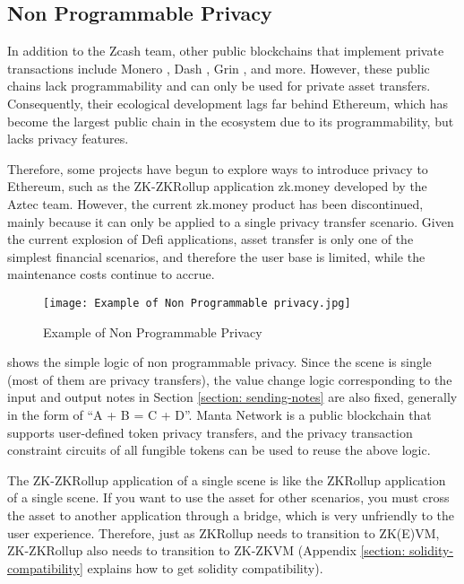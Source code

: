\subsection{Non Programmable Privacy}

In addition to the Zcash team, other public blockchains that implement private transactions include Monero \cite{website:Monero}, Dash \cite{website:Dash}, Grin \cite{website:Grin}, and more. However, these public chains lack programmability and can only be used for private asset transfers. Consequently, their ecological development lags far behind Ethereum, which has become the largest public chain in the ecosystem due to its programmability, but lacks privacy features.

Therefore, some projects have begun to explore ways to introduce privacy to Ethereum, such as the ZK-ZKRollup application zk.money \cite{website:zk.money} developed by the Aztec \cite{website:Aztec} team. However, the current zk.money product has been discontinued, mainly because it can only be applied to a single privacy transfer scenario. Given the current explosion of Defi applications, asset transfer is only one of the simplest financial scenarios, and therefore the user base is limited, while the maintenance costs continue to accrue.
\begin{figure}[!ht]
    \centering
    \texttt{[image: Example of Non Programmable privacy.jpg]}
    \caption{Example of Non Programmable Privacy}
    \label{fig:Example of Non Programmable Privacy}
\end{figure}

 shows the simple logic of non programmable privacy. Since the scene is single (most of them are privacy transfers), the value change logic corresponding to the input and output notes in Section \ref{section: sending-notes} are also fixed, generally in the form of ``A + B = C + D''. Manta Network \cite{website:Manta-network} is a public blockchain that supports user-defined token privacy transfers, and the privacy transaction 
constraint circuits of all fungible tokens can be used to reuse the above logic.

The ZK-ZKRollup application of a single scene is like the ZKRollup application of a single scene. If you want to use the asset for other scenarios, you must cross the asset to another application through a bridge, which is very unfriendly to the user experience. Therefore, just as ZKRollup needs to 
transition to ZK(E)VM, ZK-ZKRollup also needs to transition to ZK-ZKVM (Appendix \ref{section: solidity-compatibility} explains how to get solidity compatibility).
